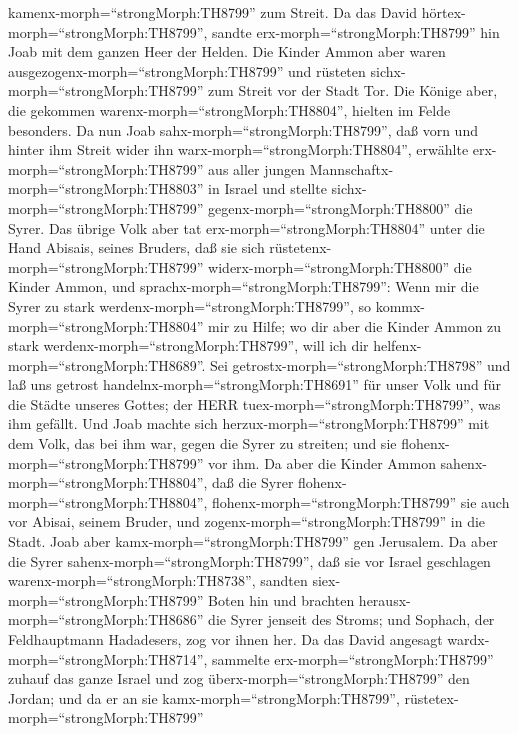 kamenx-morph=``strongMorph:TH8799'' zum Streit.  Da das
David hörtex-morph=``strongMorph:TH8799'', sandte
erx-morph=``strongMorph:TH8799'' hin Joab mit dem ganzen Heer der
Helden.  Die Kinder Ammon aber waren
ausgezogenx-morph=``strongMorph:TH8799'' und rüsteten
sichx-morph=``strongMorph:TH8799'' zum Streit vor der Stadt Tor. Die
Könige aber, die gekommen warenx-morph=``strongMorph:TH8804'', hielten
im Felde besonders.  Da nun Joab
sahx-morph=``strongMorph:TH8799'', daß vorn und hinter ihm Streit wider
ihn warx-morph=``strongMorph:TH8804'', erwählte
erx-morph=``strongMorph:TH8799'' aus aller jungen
Mannschaftx-morph=``strongMorph:TH8803'' in Israel und stellte
sichx-morph=``strongMorph:TH8799'' gegenx-morph=``strongMorph:TH8800''
die Syrer.  Das übrige Volk aber tat
erx-morph=``strongMorph:TH8804'' unter die Hand Abisais, seines Bruders,
daß sie sich rüstetenx-morph=``strongMorph:TH8799''
widerx-morph=``strongMorph:TH8800'' die Kinder Ammon,  und
sprachx-morph=``strongMorph:TH8799'': Wenn mir die Syrer zu stark
werdenx-morph=``strongMorph:TH8799'', so
kommx-morph=``strongMorph:TH8804'' mir zu Hilfe; wo dir aber die Kinder
Ammon zu stark werdenx-morph=``strongMorph:TH8799'', will ich dir
helfenx-morph=``strongMorph:TH8689''.  Sei
getrostx-morph=``strongMorph:TH8798'' und laß uns getrost
handelnx-morph=``strongMorph:TH8691'' für unser Volk und für die Städte
unseres Gottes; der HERR tuex-morph=``strongMorph:TH8799'', was ihm
gefällt.  Und Joab machte sich
herzux-morph=``strongMorph:TH8799'' mit dem Volk, das bei ihm war, gegen
die Syrer zu streiten; und sie flohenx-morph=``strongMorph:TH8799'' vor
ihm.  Da aber die Kinder Ammon
sahenx-morph=``strongMorph:TH8804'', daß die Syrer
flohenx-morph=``strongMorph:TH8804'',
flohenx-morph=``strongMorph:TH8799'' sie auch vor Abisai, seinem Bruder,
und zogenx-morph=``strongMorph:TH8799'' in die Stadt. Joab aber
kamx-morph=``strongMorph:TH8799'' gen Jerusalem.  Da aber
die Syrer sahenx-morph=``strongMorph:TH8799'', daß sie vor Israel
geschlagen warenx-morph=``strongMorph:TH8738'', sandten
siex-morph=``strongMorph:TH8799'' Boten hin und brachten
herausx-morph=``strongMorph:TH8686'' die Syrer jenseit des Stroms; und
Sophach, der Feldhauptmann Hadadesers, zog vor ihnen her. 
Da das David angesagt wardx-morph=``strongMorph:TH8714'', sammelte
erx-morph=``strongMorph:TH8799'' zuhauf das ganze Israel und zog
überx-morph=``strongMorph:TH8799'' den Jordan; und da er an sie
kamx-morph=``strongMorph:TH8799'', rüstetex-morph=``strongMorph:TH8799''
